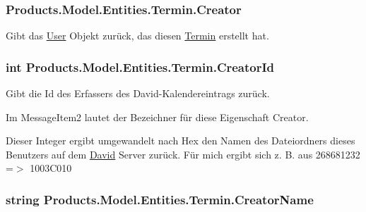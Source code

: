 \subsubsection[{\texorpdfstring{Creator}{Creator}}]{ Products.\+Model.\+Entities.\+Termin.\+Creator\hspace{0.3cm}{\ttfamily [get]}}\hypertarget{class_products_1_1_model_1_1_entities_1_1_termin_a1a628398d9d647b8c794d041e00a851c}{}\label{class_products_1_1_model_1_1_entities_1_1_termin_a1a628398d9d647b8c794d041e00a851c}


Gibt das \hyperlink{class_products_1_1_model_1_1_entities_1_1_user}{User} Objekt zurück, das diesen \hyperlink{class_products_1_1_model_1_1_entities_1_1_termin}{Termin} erstellt hat. 

\subsubsection[{\texorpdfstring{Creator\+Id}{CreatorId}}]{\setlength{\rightskip}{0pt plus 5cm}int Products.\+Model.\+Entities.\+Termin.\+Creator\+Id\hspace{0.3cm}{\ttfamily [get]}}\hypertarget{class_products_1_1_model_1_1_entities_1_1_termin_a3d97467e2a1092bf0ba195e4c0b6d53c}{}\label{class_products_1_1_model_1_1_entities_1_1_termin_a3d97467e2a1092bf0ba195e4c0b6d53c}


Gibt die Id des Erfassers des David-\/\+Kalendereintrags zurück. 

Im Message\+Item2 lautet der Bezeichner für diese Eigenschaft \textquotesingle{}Creator\textquotesingle{}.

Dieser Integer ergibt umgewandelt nach Hex den Namen des Dateiordners dieses Benutzers auf dem \hyperlink{namespace_david}{David} Server zurück. Für mich ergibt sich z. B. aus 268681232 =$>$ 1003\+C010 
\subsubsection[{\texorpdfstring{Creator\+Name}{CreatorName}}]{\setlength{\rightskip}{0pt plus 5cm}string Products.\+Model.\+Entities.\+Termin.\+Creator\+Name\hspace{0.3cm}{\ttfamily [get]}}\hypertarget{class_products_1_1_model_1_1_entities_1_1_termin_a47156ac7612f0979f2bd80ccc4739ac6}{}\label{class_products_1_1_model_1_1_entities_1_1_termin_a47156ac7612f0979f2bd80ccc4739ac6}


